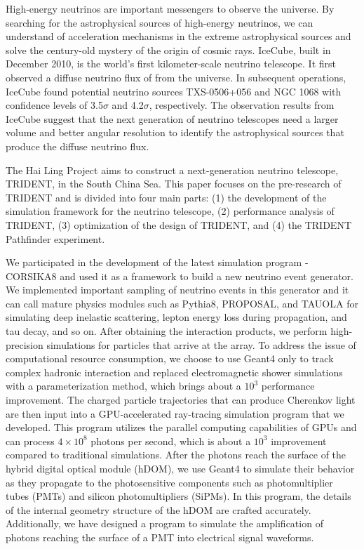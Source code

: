 \begin{eabstract}

High-energy neutrinos are important messengers to observe the universe. By searching for the astrophysical sources of high-energy neutrinos, we can understand of acceleration mechanisms in the extreme astrophysical sources and solve the century-old mystery of the origin of cosmic rays.
IceCube, built in December 2010, is the world's first kilometer-scale neutrino telescope. It first observed a diffuse neutrino flux of from the universe. In subsequent operations, IceCube found potential neutrino sources TXS-0506+056 and NGC 1068 with confidence levels of 3.5$\sigma$ and 4.2$\sigma$, respectively.
The observation results from IceCube suggest that the next generation of neutrino telescopes need a larger volume and better angular resolution to identify the astrophysical sources that produce the diffuse neutrino flux.

The Hai Ling Project aims to construct a next-generation neutrino telescope, TRIDENT, in the South China Sea. This paper focuses on the pre-research of TRIDENT and is divided into four main parts: (1) the development of the simulation framework for the neutrino telescope, (2) performance analysis of TRIDENT, (3) optimization of the design of TRIDENT, and (4) the TRIDENT Pathfinder experiment.

We participated in the development of the latest simulation program - CORSIKA8 and used it as a framework to build a new neutrino event generator. We implemented important sampling of neutrino events in this generator and it can call mature physics modules such as Pythia8, PROPOSAL, and TAUOLA for simulating deep inelastic scattering, lepton energy loss during propagation, and tau decay, and so on.
After obtaining the interaction products, we perform high-precision simulations for particles that arrive at the array. To address the issue of computational resource consumption, we choose to use Geant4 only to track complex hadronic interaction and replaced electromagnetic shower simulations with a parameterization method, which brings about a $10^3$ performance improvement.
The charged particle trajectories that can produce Cherenkov light are then input into a GPU-accelerated ray-tracing simulation program that we developed. This program utilizes the parallel computing capabilities of GPUs and can process $4 \times 10^8$ photons per second, which is about a $10^3$ improvement compared to traditional simulations.
After the photons reach the surface of the hybrid digital optical module (hDOM), we use Geant4 to simulate their behavior as they propagate to the photosensitive components such as photomultiplier tubes (PMTs) and silicon photomultipliers (SiPMs). In this program, the details of the internal geometry structure of the hDOM are crafted accurately.
Additionally, we have designed a program to simulate the amplification of photons reaching the surface of a PMT into electrical signal waveforms.


\end{eabstract}
